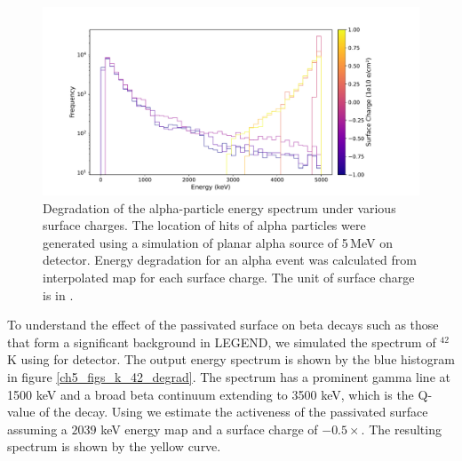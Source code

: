 \begin{figure}%
  \centering
  \includegraphics[trim={1.5cm 0.0cm 3.5cm 1.7cm},clip,width=0.99\linewidth]{ch5/figs/eng_deg_hist.pdf}
  \caption{Degradation of the alpha-particle energy spectrum under various surface charges. The location of hits of alpha particles were generated using a {\geant} simulation of planar alpha source of 5\,MeV on {\ponama} detector. Energy degradation for an alpha event was calculated from interpolated map for each surface charge. The unit of surface charge is in {\scunit}.}
  \label{fig:eng_spec_degradation}
\end{figure}

To understand the effect of the passivated surface on beta decays such as those that form a significant background in LEGEND, we simulated the spectrum of $^{42}$K using {\geant} for {\ponama} detector. The output energy spectrum is shown by the blue histogram in figure \ref{ch5_figs_k_42_degrad}. The spectrum has a prominent gamma line at 1500 keV and a broad beta continuum extending to 3500 keV, which is the Q-value of the decay. Using {\ehd} we estimate the activeness of the passivated surface assuming a $2039$ keV energy map and a surface charge of $- 0.5\times${\scunit}. The resulting spectrum is shown by the yellow curve.

